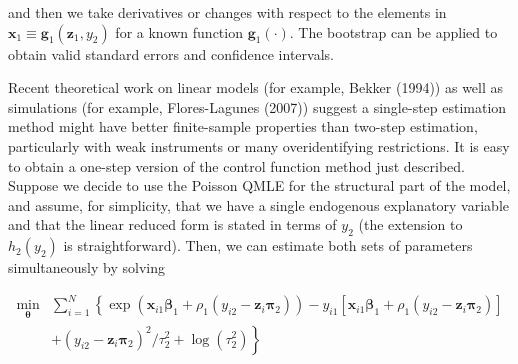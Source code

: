 \documentclass[10pt]{article}
\begin{document}
and then we take derivatives or changes with respect to the elements in $\mathbf{x}_{1} \equiv \mathbf{g}_{1}\left(\mathbf{z}_{1}, y_{2}\right)$ for a known function $\mathbf{g}_{1}(\cdot)$. The bootstrap can be applied to obtain valid standard errors and confidence intervals.

Recent theoretical work on linear models (for example, Bekker (1994)) as well as simulations (for example, Flores-Lagunes (2007)) suggest a single-step estimation method might have better finite-sample properties than two-step estimation, particularly with weak instruments or many overidentifying restrictions. It is easy to obtain a one-step version of the control function method just described. Suppose we decide to use the Poisson QMLE for the structural part of the model, and assume, for simplicity, that we have a single endogenous explanatory variable and that the linear reduced form is stated in terms of $y_{2}$ (the extension to $h_{2}\left(y_{2}\right)$ is straightforward). Then, we can estimate both sets of parameters simultaneously by solving

$$
\begin{aligned}
\min _{\boldsymbol{\theta}} & \sum_{i=1}^{N}\left\{\exp \left(\mathbf{x}_{i 1} \boldsymbol{\beta}_{1}+\rho_{1}\left(y_{i 2}-\mathbf{z}_{i} \boldsymbol{\pi}_{2}\right)\right)-y_{i 1}\left[\mathbf{x}_{i 1} \boldsymbol{\beta}_{1}+\rho_{1}\left(y_{i 2}-\mathbf{z}_{i} \boldsymbol{\pi}_{2}\right)\right]\right. \\
& \left.+\left(y_{i 2}-\mathbf{z}_{i} \boldsymbol{\pi}_{2}\right)^{2} / \tau_{2}^{2}+\log \left(\tau_{2}^{2}\right)\right\}
\end{aligned}
$$
\end{document}
